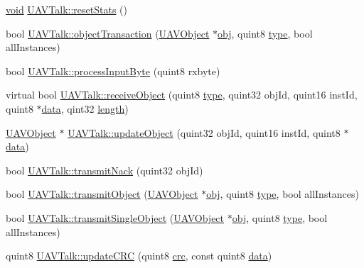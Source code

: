 \begin{DoxyCompactItemize}
\item 
\hyperlink{group___u_a_v_objects_plugin_ga444cf2ff3f0ecbe028adce838d373f5c}{void} \hyperlink{group___u_a_v_talk_plugin_gaba16247e0963a29b16a6177e685f1321}{U\-A\-V\-Talk\-::reset\-Stats} ()
\item 
bool \hyperlink{group___u_a_v_talk_plugin_gaf41ae2b1b8730f18bc3992d6777c0627}{U\-A\-V\-Talk\-::object\-Transaction} (\hyperlink{class_u_a_v_object}{U\-A\-V\-Object} $\ast$\hyperlink{glext_8h_a0c0d4701a6c89f4f7f0640715d27ab26}{obj}, quint8 \hyperlink{glext_8h_a7d05960f4f1c1b11f3177dc963a45d86}{type}, bool all\-Instances)
\item 
bool \hyperlink{group___u_a_v_talk_plugin_ga39bcb007900ed377097079d21ffe3a68}{U\-A\-V\-Talk\-::process\-Input\-Byte} (quint8 rxbyte)
\item 
virtual bool \hyperlink{group___u_a_v_talk_plugin_gaa95319b62b2b1a92e3f0ef753a1c04a3}{U\-A\-V\-Talk\-::receive\-Object} (quint8 \hyperlink{glext_8h_a7d05960f4f1c1b11f3177dc963a45d86}{type}, quint32 obj\-Id, quint16 inst\-Id, quint8 $\ast$\hyperlink{glext_8h_a8850df0785e6fbcc2351af3b686b8c7a}{data}, qint32 \hyperlink{glext_8h_a3c8469415bbc83dd1341af15c67f1cef}{length})
\item 
\hyperlink{class_u_a_v_object}{U\-A\-V\-Object} $\ast$ \hyperlink{group___u_a_v_talk_plugin_ga06d53e41c45734baa38c0eb08d684af8}{U\-A\-V\-Talk\-::update\-Object} (quint32 obj\-Id, quint16 inst\-Id, quint8 $\ast$\hyperlink{glext_8h_a8850df0785e6fbcc2351af3b686b8c7a}{data})
\item 
bool \hyperlink{group___u_a_v_talk_plugin_ga1ea574fb7b47dc949201d4c29b834208}{U\-A\-V\-Talk\-::transmit\-Nack} (quint32 obj\-Id)
\item 
bool \hyperlink{group___u_a_v_talk_plugin_ga81519c2c45745383850ccec92be1eb6a}{U\-A\-V\-Talk\-::transmit\-Object} (\hyperlink{class_u_a_v_object}{U\-A\-V\-Object} $\ast$\hyperlink{glext_8h_a0c0d4701a6c89f4f7f0640715d27ab26}{obj}, quint8 \hyperlink{glext_8h_a7d05960f4f1c1b11f3177dc963a45d86}{type}, bool all\-Instances)
\item 
bool \hyperlink{group___u_a_v_talk_plugin_ga474ec2f43670acca29d18ad9965b0440}{U\-A\-V\-Talk\-::transmit\-Single\-Object} (\hyperlink{class_u_a_v_object}{U\-A\-V\-Object} $\ast$\hyperlink{glext_8h_a0c0d4701a6c89f4f7f0640715d27ab26}{obj}, quint8 \hyperlink{glext_8h_a7d05960f4f1c1b11f3177dc963a45d86}{type}, bool all\-Instances)
\item 
quint8 \hyperlink{group___u_a_v_talk_plugin_gae15db61cd3e3604aad8fbd52ddc68fff}{U\-A\-V\-Talk\-::update\-C\-R\-C} (quint8 \hyperlink{uavobjecttemplate_8m_a6a3730e10b2455e9a8b6599785809fce}{crc}, const quint8 \hyperlink{glext_8h_a8850df0785e6fbcc2351af3b686b8c7a}{data})

\end{DoxyCompactItemize}
